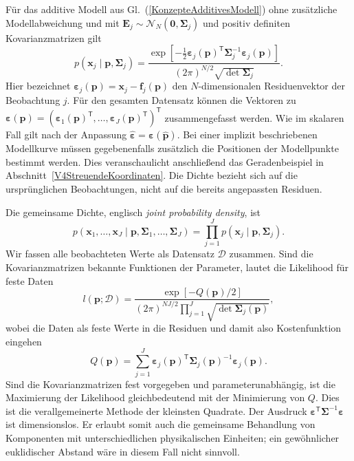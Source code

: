 Für das additive Modell aus Gl.~(\ref{KonzepteAdditivesModell}) ohne
zusätzliche Modellabweichung und mit
$\mathbf{E}_j\sim\mathcal{N}_N(\mathbf{0},\boldsymbol{\Sigma}_j)$ und
positiv definiten Kovarianzmatrizen gilt
\begin{equation}
p(\mathbf{x}_j\mid\mathbf{p},\boldsymbol{\Sigma}_j)
=\frac{\exp\!\left[-\tfrac12\boldsymbol{\varepsilon}_j(\mathbf{p})^{\mathsf{T}}
\boldsymbol{\Sigma}_j^{-1}\boldsymbol{\varepsilon}_j(\mathbf{p})\right]}
{(2\pi)^{N/2}\sqrt{\det\boldsymbol{\Sigma}_j}}.
\end{equation}
Hier bezeichnet
$\boldsymbol{\varepsilon}_j(\mathbf{p})=\mathbf{x}_j-\mathbf{f}_j(\mathbf{p})$
den $N$-dimensionalen Residuenvektor der Beobachtung $j$.
Für den gesamten Datensatz können die Vektoren zu
$\boldsymbol{\varepsilon}(\mathbf{p})
=(\boldsymbol{\varepsilon}_1(\mathbf{p})^\mathsf{T},\dots,
\boldsymbol{\varepsilon}_J(\mathbf{p})^\mathsf{T})^\mathsf{T}$
zusammengefasst werden. Wie im skalaren Fall gilt nach der Anpassung
$\widehat{\boldsymbol{\varepsilon}}
=\boldsymbol{\varepsilon}(\widehat{\mathbf{p}})$.
Bei einer implizit beschriebenen Modellkurve müssen gegebenenfalls
zusätzlich die Positionen der Modellpunkte bestimmt werden. Dies
veranschaulicht anschließend das Geradenbeispiel in
Abschnitt~\ref{V4StreuendeKoordinaten}. Die Dichte bezieht sich auf die ursprünglichen
Beobachtungen, nicht auf die bereits angepassten Residuen.

Die gemeinsame Dichte, englisch \textsl{joint probability density}, ist
\begin{equation}
p(\mathbf{x}_1,\dots,\mathbf{x}_J\mid
\mathbf{p},\boldsymbol{\Sigma}_1,\dots,\boldsymbol{\Sigma}_J)
=\prod_{j=1}^{J}p(\mathbf{x}_j\mid\mathbf{p},\boldsymbol{\Sigma}_j).
\label{LikelihoodKov}
\end{equation}
Wir fassen alle beobachteten Werte als Datensatz $\mathcal{D}$ zusammen.
Sind die Kovarianzmatrizen bekannte Funktionen der Parameter, lautet
die Likelihood für feste Daten
\begin{equation}
l(\mathbf{p};\mathcal{D})
=\frac{\exp[-Q(\mathbf{p})/2]}
{(2\pi)^{NJ/2}\displaystyle\prod_{j=1}^{J}
\sqrt{\det\boldsymbol{\Sigma}_j(\mathbf{p})}},
\label{LikelihoodKov2}
\end{equation}
wobei die Daten als feste Werte in die Residuen und damit also Kostenfunktion eingehen
\begin{equation}
Q(\mathbf{p})=\sum_{j=1}^{J}
\boldsymbol{\varepsilon}_j(\mathbf{p})^{\mathsf{T}}
\boldsymbol{\Sigma}_j(\mathbf{p})^{-1}\boldsymbol{\varepsilon}_j(\mathbf{p}).
\label{generalLSmethod}
\end{equation}
Sind die Kovarianzmatrizen fest vorgegeben und parameterunabhängig,
ist die Maximierung der Likelihood gleichbedeutend mit der Minimierung
von $Q$. Dies ist die verallgemeinerte Methode der kleinsten Quadrate.
Der Ausdruck $\boldsymbol{\varepsilon}^{\mathsf{T}}\boldsymbol{\Sigma}^{-1}\boldsymbol{\varepsilon}$
ist dimensionslos. Er erlaubt somit auch die gemeinsame Behandlung
von Komponenten mit unterschiedlichen physikalischen Einheiten;
ein gewöhnlicher euklidischer Abstand wäre in diesem Fall nicht sinnvoll.

